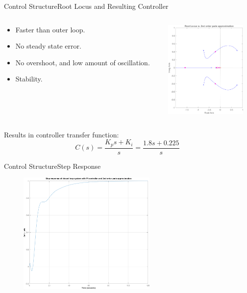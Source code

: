 \begin{frame}{Control Structure}{Root Locus and Resulting Controller}
\begin{columns}
	\begin{column}{.4\textwidth}
			\begin{itemize}
			\item Faster than outer loop.\\
			\item No steady state error.\\
			\item No overshoot, and low amount of oscillation.\\
			\item Stability.
		\end{itemize}
	\end{column}
	\begin{column}{.6\textwidth}\raggedleft
		\includegraphics[height=4.8cm,width=\linewidth]{Topics/ControlStructure/Graphics/RootLocus_Pade2.png}
		\label{fig:RootLocus}
	\end{column}
\end{columns}
	Results in controller transfer function:
	\begin{equation}\label{eq:PIDTransferFunction}
	C(s) = \frac{K_ps+K_i}{s} = \frac{1.8s+0.225}{s}
\end{equation}
\end{frame}


\begin{frame}{Control Structure}{Step Response}
	\begin{figure}[h]
		\centering
		\includegraphics[height=6cm,width=0.6\linewidth]{Topics/ControlStructure/Graphics/StepResponse_Pade2.png}
		\label{fig:StepResponse_Pade2.png}
	\end{figure}

\end{frame}

